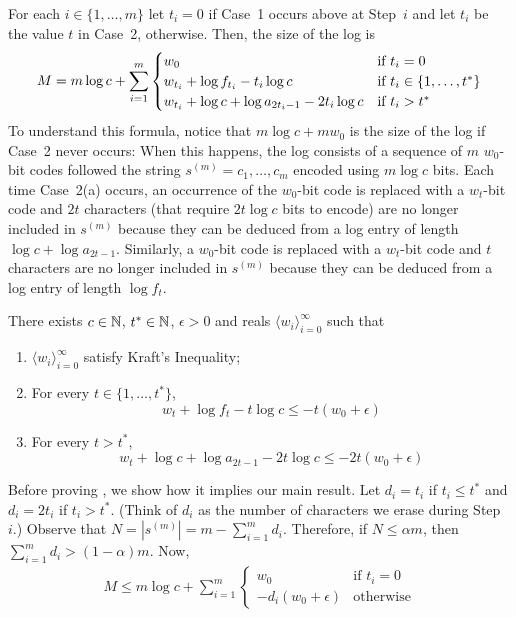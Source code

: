 \documentclass{patmorin}
\begin{document}
For each $i\in\{1,\ldots,m\}$ let $t_i=0$ if Case~1 occurs above at Step~$i$ and let $t_i$ be the value $t$ in Case~2, otherwise.  Then, the size of the log is
\begin{equation}
    M = m\log c + \sum_{i=1}^m
        \begin{cases}
           w_0 & \text{if $t_i=0$} \\
           w_{t_i} + \log f_{t_i} - t_i\log c & \text{if $t_i\in\{1,\ldots,t^*\}$} \\
           w_{t_i} + \log c + \log a_{2t_i-1} - 2t_i\log c & \text{if $t_i>t^*$}          \end{cases} \eqlabel{logsize}
\end{equation}
To understand this formula, notice that $m\log c + mw_0$ is the size of the log if Case~2 never occurs: When this happens, the log consists of a sequence of $m$ $w_0$-bit codes followed the string $s^{(m)}=c_1,\ldots,c_m$ encoded using $m\log c$ bits.  Each time Case~2(a) occurs, an occurrence of the $w_0$-bit code is replaced with a $w_t$-bit code and $2t$ characters (that require $2t\log c$ bits to encode) are no longer included in $s^{(m)}$ because they can be deduced from a log entry of length $\log c + \log a_{2t-1}$.  Similarly,  a $w_0$-bit code is replaced with a $w_t$-bit code and $t$ characters are no longer included in $s^{(m)}$ because they can be deduced from a log entry of length $\log f_t$.  

\begin{clm}
  There exists $c\in\mathbb{N}$, $t^*\in\mathbb{N}$, $\epsilon >0$ and reals $\langle w_i\rangle_{i=0}^\infty$ such that
  \begin{enumerate}
    \item $\langle w_i\rangle_{i=0}^\infty$ satisfy Kraft's Inequality;
    \item For every $t\in\{1,\ldots,t^*\}$,
    \[ w_t + \log f_{t} -t\log c \le -t(w_0+\epsilon) \]
    \item For every $t>t^*$, 
    \[ w_t + \log c + \log a_{2t-1} -2t\log c \le - 2t(w_0+\epsilon) \]
  \end{enumerate}
\end{clm}

Before proving , we show how it implies our main result.  Let $d_i=t_i$ if $t_i\le t^*$ and $d_i=2t_i$ if $t_i>t^*$.  (Think of $d_i$ as the number of characters we erase during Step~$i$.)  Observe that $N=|s^{(m)}|=m-\sum_{i=1}^m d_i$.  Therefore, if $N\le \alpha m$, then $\sum_{i=1}^m d_i > (1-\alpha)m$.  Now,
\begin{align*}
  M \le m\log c + \sum_{i=1}^m 
     \begin{cases}
         w_0 & \text{if $t_i=0$} \\
         -d_i(w_0+\epsilon) & \text{otherwise} 
       \end{cases} \label{logsize}
\end{align*} 
\end{document}
